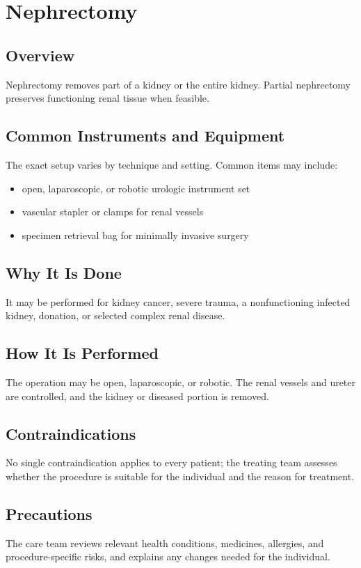 \chapter{Nephrectomy}
\section*{Overview}
Nephrectomy removes part of a kidney or the entire kidney. Partial nephrectomy preserves functioning renal tissue when feasible.
\section*{Common Instruments and Equipment}
The exact setup varies by technique and setting. Common items may include:
\begin{itemize}[nosep,leftmargin=*]
  \item open, laparoscopic, or robotic urologic instrument set
  \item vascular stapler or clamps for renal vessels
  \item specimen retrieval bag for minimally invasive surgery
\end{itemize}

\section*{Why It Is Done}
It may be performed for kidney cancer, severe trauma, a nonfunctioning infected kidney, donation, or selected complex renal disease.
\section*{How It Is Performed}
The operation may be open, laparoscopic, or robotic. The renal vessels and ureter are controlled, and the kidney or diseased portion is removed.
\section*{Contraindications}
No single contraindication applies to every patient; the treating team assesses whether the procedure is suitable for the individual and the reason for treatment.

\section*{Precautions}
The care team reviews relevant health conditions, medicines, allergies, and procedure-specific risks, and explains any changes needed for the individual.

